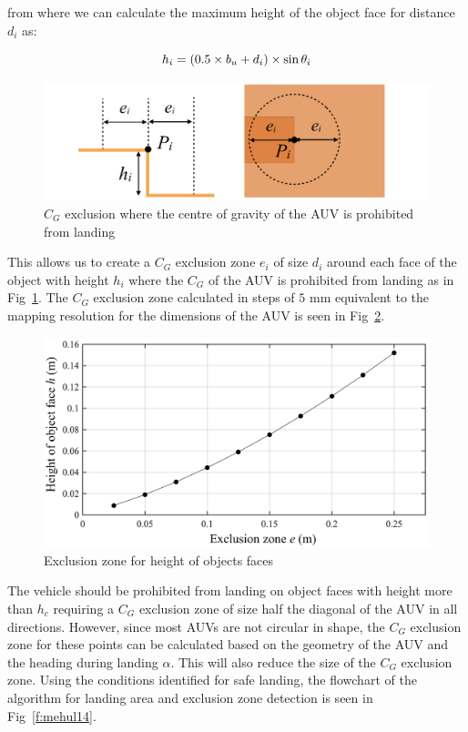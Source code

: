 from where we can calculate the maximum height of the object face for distance $d_i$ as:

\begin{equation}
\label{eq:eq7}
\centering
	h_i = (0.5 \times b_u + d_i)\times \sin\theta_i
\end{equation}


\begin{figure}[!ht]
\centering
\includegraphics[width=4.5in]{./images/mehul12.png}
\caption{$C_G$ exclusion where the centre of gravity of the AUV is prohibited from landing}
\label{f:mehul12}
\end{figure}


This allows us to create a $C_G$ exclusion zone $e_i$ of size $d_i$ around each face of the object with height $h_i$ where the $C_G$ of the AUV is prohibited from landing as in Fig~\ref{f:mehul12}. The $C_G$ exclusion zone calculated in steps of $5$ mm equivalent to the mapping resolution for the dimensions of the AUV is seen in Fig~\ref{f:mehul13}.

\begin{figure}[!ht]
\centering
\includegraphics[width=5.5in]{./images/mehul13.png}
\caption{Exclusion zone for height of objects faces}
\label{f:mehul13}
\end{figure}

The vehicle should be prohibited from landing on object faces with height more than $h_c$ requiring a $C_G$ exclusion zone of size half the diagonal of the AUV in all directions. However, since most AUVs are not circular in shape, the $C_G$ exclusion zone for these points can be calculated based on the geometry of the AUV and the heading during landing $\alpha$. This will also reduce the size of the $C_G$ exclusion zone.  Using the conditions identified for safe landing, the flowchart of the algorithm for landing area and exclusion zone detection is seen in Fig~\ref{f:mehul14}.

